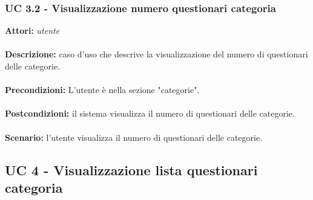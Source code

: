 \documentclass[a4paper,11pt]{article}
\begin{document}
\subsubsection{UC 3.2 - Visualizzazione numero questionari categoria}

\textbf{Attori:} \textit{utente}
\\ \\
\textbf{Descrizione:} caso d'uso che descrive la visualizzazione del numero di questionari delle categorie.\\
\\
\textbf{Precondizioni:} L'utente è nella sezione "categorie".\\
\\
\textbf{Postcondizioni:} il sistema visualizza il numero di questionari delle categorie.\\
\\
\textbf{Scenario:} l’utente visualizza il numero di questionari delle categorie.\\


\subsection{UC 4 - Visualizzazione lista questionari categoria}
\end{document}
